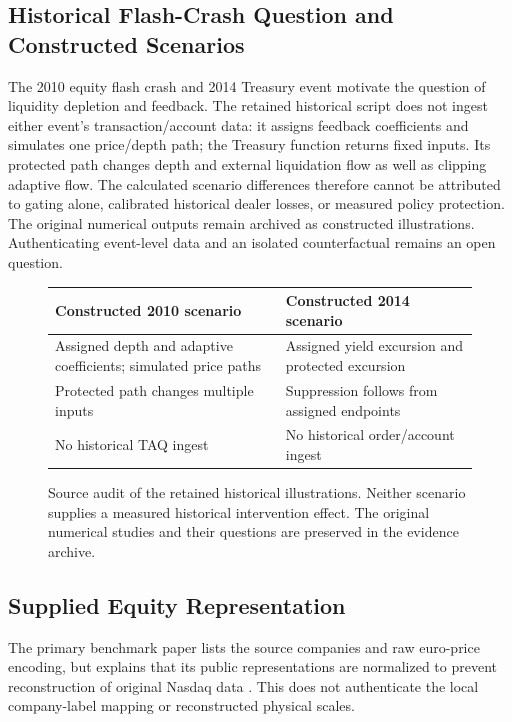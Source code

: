 \documentclass[12pt]{article}
\theoremstyle{definition}
\theoremstyle{remark}
\begin{document}
\subsection{Historical Flash-Crash Question and Constructed Scenarios}
\label{sec:historical_flash_crashes}
The 2010 equity flash crash and 2014 Treasury event motivate the question of liquidity depletion and feedback. The retained historical script does not ingest either event's transaction/account data: it assigns feedback coefficients and simulates one price/depth path; the Treasury function returns fixed inputs. Its protected path changes depth and external liquidation flow as well as clipping adaptive flow. The calculated scenario differences therefore cannot be attributed to gating alone, calibrated historical dealer losses, or measured policy protection. The original numerical outputs remain archived as constructed illustrations. Authenticating event-level data and an isolated counterfactual remains an open question.
\begin{figure}[htbp]\centering
\begin{tabularx}{\textwidth}{XX}\toprule
Constructed 2010 scenario & Constructed 2014 scenario \\\midrule
Assigned depth and adaptive coefficients; simulated price paths & Assigned yield excursion and protected excursion \\
Protected path changes multiple inputs & Suppression follows from assigned endpoints \\
No historical TAQ ingest & No historical order/account ingest \\\bottomrule\end{tabularx}
\caption{Source audit of the retained historical illustrations. Neither scenario supplies a measured historical intervention effect. The original numerical studies and their questions are preserved in the evidence archive.}
\label{fig:equity_flash_crash_taq}\end{figure}

\subsection{Supplied Equity Representation}
The primary benchmark paper lists the source companies and raw euro-price encoding, but explains that its public representations are normalized to prevent reconstruction of original Nasdaq data \citep{ntakaris2018benchmark}. This does not authenticate the local company-label mapping or reconstructed physical scales.
\end{document}
